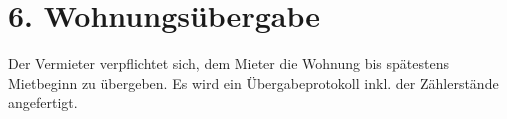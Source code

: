 \section*{6. Wohnungsübergabe}
Der Vermieter verpflichtet sich, dem Mieter die Wohnung bis spätestens Mietbeginn zu übergeben. Es wird ein Übergabeprotokoll inkl. der Zählerstände angefertigt.
